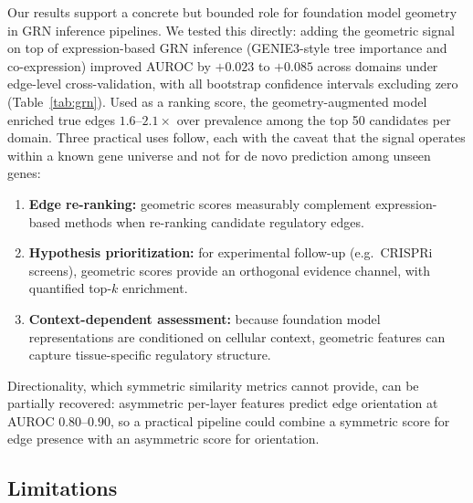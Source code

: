 \documentclass[11pt]{article}
\begin{document}
Our results support a concrete but bounded role for foundation model geometry in GRN inference pipelines.
We tested this directly: adding the geometric signal on top of expression-based GRN inference (GENIE3-style tree importance and co-expression) improved AUROC by $+0.023$ to $+0.085$ across domains under edge-level cross-validation, with all bootstrap confidence intervals excluding zero (Table~\ref{tab:grn}).
Used as a ranking score, the geometry-augmented model enriched true edges $1.6$--$2.1\times$ over prevalence among the top 50 candidates per domain.
Three practical uses follow, each with the caveat that the signal operates within a known gene universe and not for de novo prediction among unseen genes:
\begin{enumerate}[leftmargin=2em]
    \item \textbf{Edge re-ranking:} geometric scores measurably complement expression-based methods when re-ranking candidate regulatory edges.
    \item \textbf{Hypothesis prioritization:} for experimental follow-up (e.g.\ CRISPRi screens), geometric scores provide an orthogonal evidence channel, with quantified top-$k$ enrichment.
    \item \textbf{Context-dependent assessment:} because foundation model representations are conditioned on cellular context, geometric features can capture tissue-specific regulatory structure.
\end{enumerate}
Directionality, which symmetric similarity metrics cannot provide, can be partially recovered: asymmetric per-layer features predict edge orientation at AUROC $0.80$--$0.90$, so a practical pipeline could combine a symmetric score for edge presence with an asymmetric score for orientation.

\subsection*{Limitations}
\end{document}
